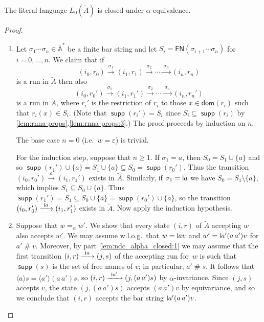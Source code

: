 \documentclass[10pt,a4paper]{amsart}
\newcommand{\midmid}{\hspace{0.2ex}{\rule[-0.1ex]{0.6pt}{1.65ex}}\hspace{0.2ex}}
\newcommand{\scriptmidmid}{\hspace{0.2ex}{\rule[-0.1ex]{0.6pt}{1.1ex}}\hspace{0.2ex}}
\newcommand{\newletter}[1]{{\midmid}#1}
\newcommand{\scriptnew}[1]{{\scriptmidmid}#1}
\newcommand{\free}[1]{\mathsf{FN}(#1)}
\newcommand{\barA}{\overline{\names}}
\numberwithin{equation}{section}
\newcommand{\xto}[1]{\xrightarrow{~#1~}}
\newcommand{\seq}{\subseteq}
\newcommand{\tl}{\widetilde}
\newcommand{\braket}[1]{\langle #1 \rangle}
\renewcommand{\epsilon}{\varepsilon}
\newcommand{\+}[1]{\mathcal{#1}\xspace}
\newcommand{\names}{\mathbb{A}}
\DeclareMathOperator{\supp}{\mathsf{supp}} %
\newcommand{\fresh}{\mathbin{\#}}
\theoremstyle{definition}
\begin{document}
\begin{lemma}\label{lem:ndc_alpha_closed}
  The literal language $L_0(\tl A)$ is closed under $\alpha$-equivalence.
\end{lemma}
%
\begin{proof}
  \begin{enumerate}
  \item\label{lem:ndc_alpha_closed:1} Let
    $\sigma_1\cdots \sigma_n\in \barA^*$ be a finite bar string and
    let $S_i=\free{\sigma_{i+1}\cdots \sigma_n}$ for
    $i=0,\ldots,n$. We claim that if
    \[
      (i_0,r_0)\xto{\sigma_1} (i_1, r_1)\xto{\sigma_2} \cdots \xto{\sigma_n} (i_n, r_n)
    \]
    is a run in $\tl{A}$ then also
    \[
      (i_0,r_0')\xto{\sigma_1} (i_1, r_1')\xto{\sigma_2} \cdots \xto{\sigma_n}
      (i_n, r_n')
    \]
    is a run in $\tl{A}$, where $r_i'$ is the restriction of $r_i$ to
    those $x\in \mathsf{dom}(r_i)$ such that $r_i(x)\in S_i$. (Note that
    $\supp(r_i')=S_i$ since $S_i\seq \supp(r_i)$ by \autoref{lem:rnna-props}.\ref{lem:rnna-props:3}.) The proof proceeds by
    induction on $n$.

    \smallskip\noindent The base case $n=0$ (i.e.~$w=\epsilon$) is
    trivial.
  
    \smallskip\noindent For the induction step, suppose that
    $n\geq 1$. If $\sigma_1=a$, then $S_0=S_1\cup \{a\}$ and so
    $\supp(r_1')\cup \{a\}=S_1\cup \{a\}\seq S_0 =\supp(r_0')$. Thus
    the transition $(i_0,r_0')\xto{a}(i_1,r_1')$ exists in
    $\tl{A}$. Similarly, if $\sigma_1=\newletter a$ we have
    $S_0=S_1\setminus \{a\}$, which implies $S_1\seq S_0\cup
    \{a\}$. Thus
    $\supp(r_1')=S_1 \seq S_0\cup \{a\} = \supp(r_0')\cup \{a\}$, so
    the transition $(i_0,r_0')\xto{\scriptnew a}(i_1,r_1')$ exists in
    $\tl{A}$. Now apply the induction hypothesis.

  \item Suppose that $w=_\alpha w'$. We show that every state $(i,r)$ of
    $\tl{A}$ accepting $w$ also accepts $w'$. We may assume w.l.o.g.\
    that $w=\newletter av$ and $w'=\newletter a'(a\, a')v$ for $a'\fresh v$. Moreover, by
    part \ref{lem:ndc_alpha_closed:1} we may assume that the
    first transition $(i,r)\xto{\scriptnew a} (j,s)$ of the accepting run
    for~$w$ is such that $\supp(s)$ is the set of free names of $v$;
    in particular, $a'\fresh s$. It follows that
    $\braket{a} s = \braket{a'} (a\, a')s$, so
    $(i,r)\xto{\scriptnew a'} (j,(a\, a')s)$ by $\alpha$-invariance. Since
    $(j,s)$ accepts $v$, the state $(j,(a\, a')s)$ accepts $(a\, a')v$
    by equivariance, and so we conclude that $(i,r)$ accepts
    the bar string $\newletter a'(a\, a')v$.\qedhere
  \end{enumerate}
\end{proof}
\end{document}
